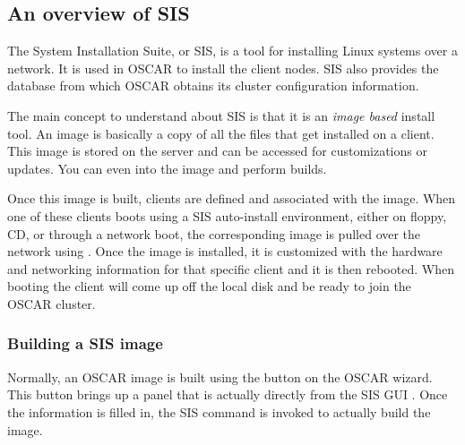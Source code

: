%
%
% 
% 
% 
% 
%

\subsection{An overview of SIS}
\label{app:sis-overview}

The System Installation Suite, or SIS, is a tool for installing 
Linux systems over a network. It is used in OSCAR to install the
client nodes. SIS also provides the database from which OSCAR
obtains its cluster configuration information.

The main concept to understand about SIS is that it is an
\emph{image based} install tool. An image is basically a copy
of all the files that get installed on a client. This image
is stored on the server and can be accessed for customizations or
updates. You can even  into the image and perform builds.

Once this image is built, clients are defined and associated with the
image. When one of these clients boots using a SIS auto-install
environment, either on floppy, CD, or through a network boot, the
corresponding image is pulled over the network using . 
Once the image is installed, it is customized with the hardware and
networking information for that specific client and it is then rebooted.
When booting the client will come up off the local disk and be ready
to join the OSCAR cluster.

\subsubsection{Building a SIS image}

Normally, an OSCAR image is built using the  
button on the OSCAR wizard. This button brings up a panel that is actually 
directly from the SIS GUI . Once the information is filled in,
the SIS command  is invoked to actually build the image. 

